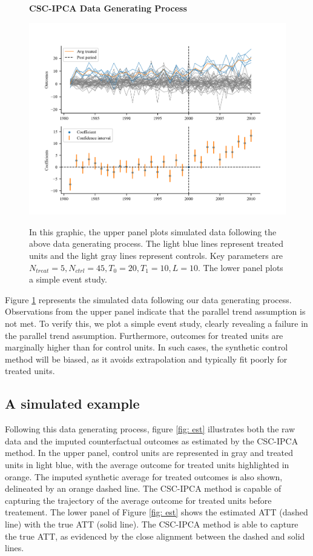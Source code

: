 \documentclass[12pt]{article}
\begin{document}
\begin{figure}[!ht]
    \centering
    \caption{\textbf{CSC-IPCA Data Generating Process}}
    \includegraphics{figs/data_plot.png}
    \label{fig: sim}
    \caption*{\footnotesize{In this graphic, the upper panel plots simulated data following the above data generating process. The light blue lines represent treated units and the light gray lines represent controls. Key parameters are$N_{treat} = 5, N_{ctrl} = 45, T_0=20, T_1=10, L=10$. The lower panel plots a simple event study.}}
    \end{figure}

Figure \ref{fig: sim} represents the simulated data following our data generating process. Observations from the upper panel indicate that the parallel trend assumption is not met. To verify this, we plot a simple event study, clearly revealing a failure in the parallel trend assumption. Furthermore, outcomes for treated units are marginally higher than for control units. In such cases, the synthetic control method will be biased, as it avoids extrapolation and typically fit poorly for treated units.

\subsection{A simulated example}
Following this data generating process, figure \ref{fig: est} illustrates both the raw data and the imputed counterfactual outcomes as estimated by the CSC-IPCA method. In the upper panel, control units are represented in gray and treated units in light blue, with the average outcome for treated units highlighted in orange. The imputed synthetic average for treated outcomes is also shown, delineated by an orange dashed line. The CSC-IPCA method is capable of capturing the trajectory of the average outcome for treated units before treatement. The lower panel of Figure \ref{fig: est} shows the estimated ATT (dashed line) with the true ATT (solid line). The CSC-IPCA method is able to capture the true ATT, as evidenced by the close alignment between the dashed and solid lines.
\end{document}
